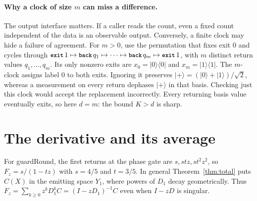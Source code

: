\documentclass[acmsmall,screen,review,anonymous,nonacm]{acmart}
\newcommand{\storyinlinekwface}{\storyinlineface\bfseries}}
\newcommand{\storyinlineface}{\small\ttfamily}
\newcommand{\storyinlinekwface}{\small\ttfamily\bfseries}
\newcommand{\kw}[1]{\textnormal{\storyinlinekwface #1}}
\newcommand{\code}[1]{\textnormal{\storyinlineface #1}}
\newcommand{\ket}[1]{\lvert #1\rangle}
\newcommand{\bra}[1]{\langle #1\rvert}
\numberwithin{equation}{section}
\begin{document}
\paragraph{Why a clock of size $m$ can miss a difference.}
The output interface matters. If a caller reads the count, even a
fixed count independent of the data is an observable output.
Conversely, a finite clock may hide a failure of agreement. For $m>0$, use the
permutation that fixes \code{exit 0} and cycles through
$\kw{exit}\,1\mapsto\kw{back}\,q_1\mapsto\cdots\mapsto
\kw{back}\,q_m\mapsto\kw{exit}\,1$, with $m$ distinct return
values $q_1,\ldots,q_m$.
Its only nonzero exits are $x_0=\ket0\bra0$ and $x_m=\ket1\bra1$. The
$m$-clock assigns label $0$ to both exits. Ignoring it preserves
$\ket+=(\ket0+\ket1)/\sqrt2$, whereas a measurement on every return
dephases $\ket+$ in that basis. Checking just this clock would accept
the replacement incorrectly. Every returning basis value eventually exits, so here
$d=m$: the bound $K>d$ is sharp.

\section{The derivative and its average}\label{app:deriv}
For \code{guardRound}, the first returns at the phase gate are $s,stz,st^2z^2$,
so $F_z=s/(1-tz)$ with $s=4/5$ and $t=3/5$. In general Theorem~\ref{thm:total}
puts $C(X)$ in the emitting space $Y_1$, where powers of $D_1$ decay geometrically.
Thus $F_z=\sum_{k\ge0}z^kD_1^k C=(I-zD_1)^{-1}C$ even when $I-zD$ is singular.
\end{document}
